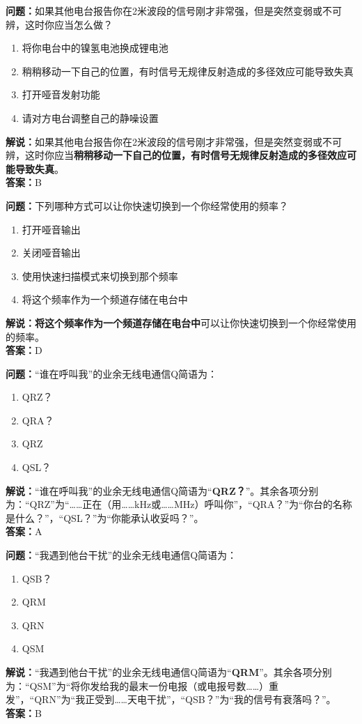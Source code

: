 \textbf{问题：}如果其他电台报告你在2米波段的信号刚才非常强，但是突然变弱或不可辨，这时你应当怎么做？
\begin{enumerate}[label=\Alph*), leftmargin=1.5cm]
	\item 将你电台中的镍氢电池换成锂电池
	\item 稍稍移动一下自己的位置，有时信号无规律反射造成的多径效应可能导致失真
	\item 打开哑音发射功能
	\item 请对方电台调整自己的静噪设置
\end{enumerate}
\textbf{解说：}如果其他电台报告你在2米波段的信号刚才非常强，但是突然变弱或不可辨，这时你应当\textbf{稍稍移动一下自己的位置，有时信号无规律反射造成的多径效应可能导致失真}。\\\textbf{答案：}B



\textbf{问题：}下列哪种方式可以让你快速切换到一个你经常使用的频率？
\begin{enumerate}[label=\Alph*), leftmargin=1.5cm]
	\item 打开哑音输出
	\item 关闭哑音输出
	\item 使用快速扫描模式来切换到那个频率
	\item 将这个频率作为一个频道存储在电台中
\end{enumerate}
\textbf{解说：}\textbf{将这个频率作为一个频道存储在电台中}可以让你快速切换到一个你经常使用的频率。\\\textbf{答案：}D



\textbf{问题：}“谁在呼叫我”的业余无线电通信Q简语为：

\begin{enumerate}[label=\Alph*), leftmargin=1.5cm]
	\item QRZ？
	\item QRA？
	\item QRZ
	\item QSL？
\end{enumerate}

\textbf{解说：}“谁在呼叫我”的业余无线电通信Q简语为“\textbf{QRZ？}”。其余各项分别为：“QRZ”为“……正在（用……kHz或……MHz）呼叫你”，“QRA？”为“你台的名称是什么？”，“QSL？”为“你能承认收妥吗？”。\\\textbf{答案：}A



\textbf{问题：}“我遇到他台干扰”的业余无线电通信Q简语为：

\begin{enumerate}[label=\Alph*), leftmargin=1.5cm]
	\item QSB？
	\item QRM
	\item QRN
	\item QSM
\end{enumerate}
\textbf{解说：}“我遇到他台干扰”的业余无线电通信Q简语为“\textbf{QRM}”。其余各项分别为：“QSM”为“将你发给我的最末一份电报（或电报号数……）重发”，“QRN”为“我正受到……天电干扰”，“QSB？”为“我的信号有衰落吗？”。\\\textbf{答案：}B




